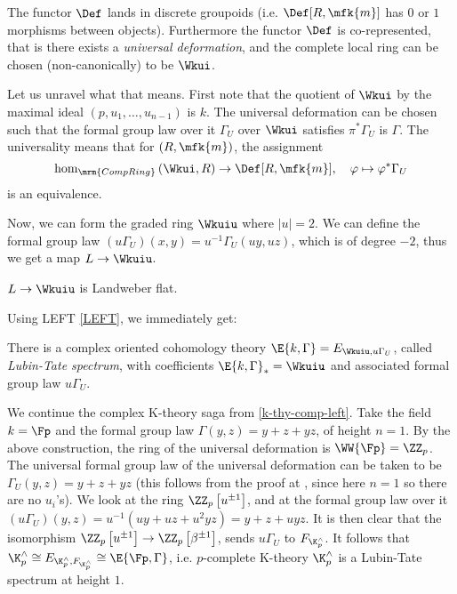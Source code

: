\begin{theorem}
	The functor $\Def$ lands in discrete groupoids (i.e. $\Def[R, \mfk{m}]$ has $0$ or $1$ morphisms between objects).
	Furthermore the functor $\Def$ is co-represented, that is there exists a \emph{universal deformation}, and the complete local ring can be chosen (non-canonically) to be $\Wkui$.
\end{theorem}

Let us unravel what that means.
First note that the quotient of $\Wkui$ by the maximal ideal $\left(p, u_1, \dotsc, u_{n-1}\right)$ is $k$.
The universal deformation can be chosen such that the formal group law over it $\Gamma_U$ over $\Wkui$ satisfies $\pi^* \Gamma_U$ is $\Gamma$.
The universality means that for $\left(R, \mfk{m}\right)$, the assignment
$$
\hom_{\mrm{CompRing}}\left(\Wkui, R\right) \to \Def[R, \mfk{m}], \quad
\varphi \mapsto \varphi^* \Gamma_U
$$
is an equivalence.

Now, we can form the graded ring $\Wkuiu$ where $\left|u\right| = 2$.
We can define the formal group law $\left(u \Gamma_U\right) \left(x, y\right) = u^{-1} \Gamma_U \left(u y, u z\right)$, which is of degree $-2$, thus we get a map $L \to \Wkuiu$.

\begin{proposition}
	$L \to \Wkuiu$ is Landweber flat.
\end{proposition}

Using LEFT \ref{LEFT}, we immediately get:

\begin{corollary}\label{LT-spectrum}
	There is a complex oriented cohomology theory $\E{k, \Gamma} = E_{\Wkuiu, u \Gamma_U}$, called \emph{Lubin-Tate spectrum}, with coefficients $\E{k, \Gamma}_* = \Wkuiu$ and associated formal group law $u \Gamma_U$.
\end{corollary}

\begin{example}\label{k-thy-comp-defo}
	We continue the complex K-theory saga from \ref{k-thy-comp-left}.
	Take the field $k = \Fp$ and the formal group law $\Gamma\left(y, z\right) = y + z + y z$, of height $n = 1$.
	By the above construction, the ring of the universal deformation is $\WW{\Fp} = \ZZ_p$.
	The universal formal group law of the universal deformation can be taken to be $\Gamma_U \left(y, z\right) = y + z + y z$ (this follows from the proof at \cite[5.10]{Rez}, since here $n=1$ so there are no $u_i$'s).
	We look at the ring $\ZZ_p\left[u^{\pm1}\right]$, and at the formal group law over it
	$
	\left(u\Gamma_U\right) \left(y, z\right)
	= u^{-1} \left(u y + u z + u^2 y z\right)
	= y + z + u y z
	$.
	It is then clear that the isomorphism $\ZZ_p\left[u^{\pm1}\right] \to \ZZ_p\left[\beta^{\pm1}\right]$, sends $u\Gamma_U$ to $F_{\K_p^\wedge}$.
	It follows that
	$
	\K_p^\wedge
	\cong E_{\K_p^\wedge, F_{\K_p^\wedge}}
	\cong \E{\Fp, \Gamma}
	$,
	i.e. $p$-complete K-theory $\K_p^\wedge$ is a Lubin-Tate spectrum at height $1$.
\end{example}

